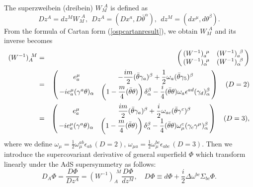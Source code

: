 \documentclass[a4paper,12pt]{article}
\def\btheta{\bar{\theta}}
\def\dfrac#1#2{{\displaystyle\frac{#1}{#2}}}
\def\cfrac#1#2{\dfrac{\mathstrut #1}{#2}}
\begin{document}
The superzweibein (dreibein) $W_{M}^{\>\>A}$ is defined as
\begin{equation}
 Dz^{A} = dz^{M}W_{M}^{\>\>A},\ \  Dz^{A}=(Dx^{a}, D\btheta^{\alpha})
  ,\ \ dz^{M}=(dx^{\mu}, d\theta^{\beta}).
\end{equation}
\relax From the formula of Cartan form (\ref{ospcartanresult}), we
obtain $W_{M}^{\>\>A}$ and its inverse becomes
\begin{eqnarray}
 (W^{-1})_{A}^{\>\>M} 
 &=& \left(\begin{array}{@{\,}cc@{\,}}
      (W^{-1})_{a}^{\>\>\mu} & (W^{-1})_{a}^{\>\>\beta} \\
      (W^{-1})_{\alpha}^{\>\>\mu} & (W^{-1})_{\alpha}^{\>\>\beta}
      \end{array}\right) \nonumber \\
 &=& \left(
  \begin{array}{@{\,}cc@{\,}}
   e^{\mu}_{a} & -\cfrac{im}{2}(\btheta\gamma_{a})^{\beta}
                 + \cfrac{1}{2}\omega_{a}(\btheta\gamma_{5})^{\beta} \\
   -ie^{\mu}_{a}(\gamma^{a}\theta)_{\alpha}
               & \left(1-\cfrac{m}{4}(\btheta\theta)\right)
	       \delta^{\beta}_{\alpha}
	       - \cfrac{i}{4}(\btheta\theta)\omega_{a}\epsilon^{ad}
	                                (\gamma_{d})^{\beta}_{\alpha}
  \end{array}\right)\quad (D=2) \\
 &=& \left(
  \begin{array}{@{\,}cc@{\,}}
   e^{\mu}_{a} & \cfrac{im}{2}(\btheta\gamma_{a})^{\beta}
                 + \cfrac{i}{2}\omega_{ac}(\btheta\gamma^{c})^{\beta} \\
   -ie^{\mu}_{a}(\gamma^{a}\theta)_{\alpha}
               & \left(1-\cfrac{m}{4}(\btheta\theta)\right)
	       \delta^{\beta}_{\alpha}
     			- \cfrac{1}{4}(\btheta\theta)\omega_{\mu}^{c}
	                       (\gamma_{c}\gamma^{\mu})^{\beta}_{\alpha}
  \end{array}\right)\quad (D=3), \nonumber
  \label{ospzweibeinresult}
\end{eqnarray}
where we define
 $\omega_{\mu}=\frac{1}{2}\omega_{\mu}^{ab}\epsilon_{ab}\,(D=2)$,
 $\omega_{\mu a}=\frac{1}{2}\omega_{\mu}^{bc}\epsilon_{abc}\,(D=3)$.
Then we introduce the supercovariant derivative of general superfield $\Phi$
 which transform linearly under the AdS supersymmetry as follows:
\begin{equation}
 D_{A}\Phi = \frac{D\Phi}{Dz^{A}} = (W^{-1})_{A}^{\>\>M}\frac{D\Phi}{dz^{M}},
 \quad
 D\Phi \equiv d\Phi + \frac{i}{2}\mathit{\Delta}\omega^{bc}\Sigma_{bc} 
 \Phi.
\end{equation}
\end{document}
